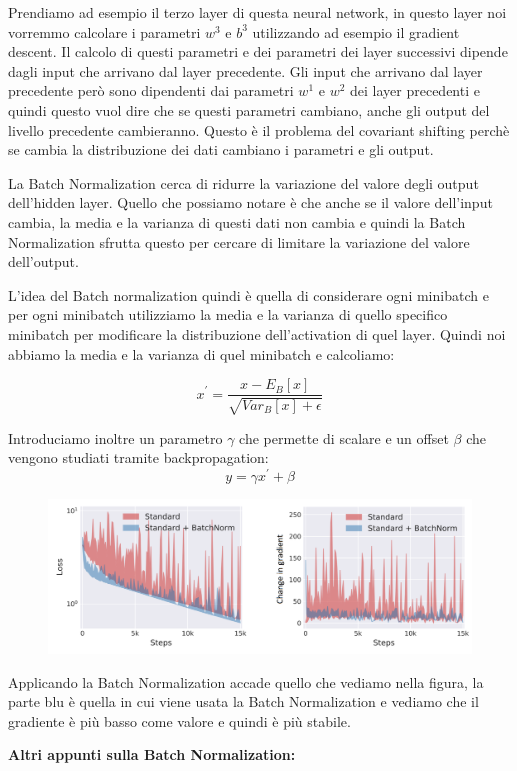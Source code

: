 \documentclass[14pt]{extreport}
\begin{document}
Prendiamo ad esempio il terzo layer di questa neural network, in questo layer noi vorremmo calcolare i parametri $w^3$ e $b^3$ utilizzando ad esempio
il gradient descent. Il calcolo di questi parametri e dei parametri dei layer successivi dipende dagli input che arrivano dal layer precedente. Gli
input che arrivano dal layer precedente però sono dipendenti dai parametri $w^1$ e $w^2$ dei layer precedenti e quindi questo vuol dire che se questi
parametri cambiano, anche gli output del livello precedente cambieranno. Questo è il problema del covariant shifting perchè se cambia la distribuzione
dei dati cambiano i parametri e gli output.

La Batch Normalization cerca di ridurre la variazione del valore degli output dell'hidden layer. Quello che possiamo notare è che anche se il valore
dell'input cambia, la media e la varianza di questi dati non cambia e quindi la Batch Normalization sfrutta questo per cercare di limitare la
variazione del valore dell'output.

L'idea del Batch normalization quindi è quella di considerare ogni minibatch e per ogni minibatch utilizziamo la media e la varianza di quello
specifico minibatch per modificare la distribuzione dell'activation di quel layer. Quindi noi abbiamo la media e la varianza di quel minibatch e
calcoliamo:

$$x^{'} = \frac{x-E_B[x]}{\sqrt{Var_B[x]+\epsilon}}$$

Introduciamo inoltre un parametro $\gamma$ che permette di scalare e un offset $\beta$ che vengono studiati tramite backpropagation:
$$y = \gamma x^{'} + \beta$$

\begin{figure}[H]
	\centering
	\includegraphics[width=0.7\linewidth]{430.jpeg}
\end{figure}

Applicando la Batch Normalization accade quello che vediamo nella figura, la parte blu è quella in cui viene usata la Batch Normalization e vediamo
che il gradiente è più basso come valore e quindi è più stabile.


\textbf{Altri appunti sulla Batch Normalization:}
\end{document}
